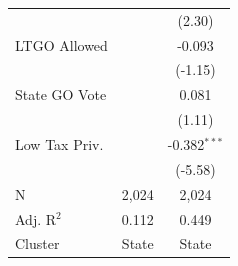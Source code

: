 \begin{tabular*}{\textwidth}{@{\extracolsep{\fill}}lcc}
                               &               & (2.30)\\   
   LTGO Allowed                &               & -0.093\\   
                               &               & (-1.15)\\   
   State GO Vote               &               & 0.081\\   
                               &               & (1.11)\\   
   Low Tax Priv.               &               & -0.382$^{***}$\\   
                               &               & (-5.58)\\   
   \hline
   N                & 2,024         & 2,024\\  
   Adj. R$^2$              & 0.112         & 0.449\\  
   Cluster              & State & State\\  
   \bottomrule
\end{tabular*}
\par\endgroup
